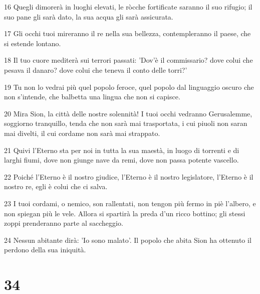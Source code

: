 \par 16 Quegli dimorerà in luoghi elevati, le ròcche fortificate saranno il suo rifugio; il suo pane gli sarà dato, la sua acqua gli sarà assicurata.
\par 17 Gli occhi tuoi mireranno il re nella sua bellezza, contempleranno il paese, che si estende lontano.
\par 18 Il tuo cuore mediterà sui terrori passati: 'Dov'è il commissario? dove colui che pesava il danaro? dove colui che teneva il conto delle torri?'
\par 19 Tu non lo vedrai più quel popolo feroce, quel popolo dal linguaggio oscuro che non s'intende, che balbetta una lingua che non si capisce.
\par 20 Mira Sion, la città delle nostre solennità! I tuoi occhi vedranno Gerusalemme, soggiorno tranquillo, tenda che non sarà mai trasportata, i cui piuoli non saran mai divelti, il cui cordame non sarà mai strappato.
\par 21 Quivi l'Eterno sta per noi in tutta la sua maestà, in luogo di torrenti e di larghi fiumi, dove non giunge nave da remi, dove non passa potente vascello.
\par 22 Poiché l'Eterno è il nostro giudice, l'Eterno è il nostro legislatore, l'Eterno è il nostro re, egli è colui che ci salva.
\par 23 I tuoi cordami, o nemico, son rallentati, non tengon più fermo in piè l'albero, e non spiegan più le vele. Allora si spartirà la preda d'un ricco bottino; gli stessi zoppi prenderanno parte al saccheggio.
\par 24 Nessun abitante dirà: 'Io sono malato'. Il popolo che abita Sion ha ottenuto il perdono della sua iniquità.

\chapter{34}


